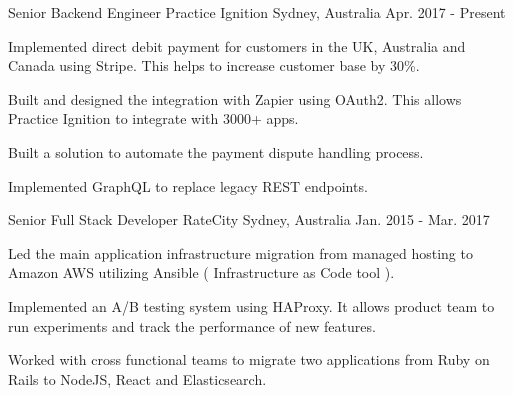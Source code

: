 
\begin{cventries}

  \cventry
    {Senior Backend Engineer} %
    {Practice Ignition} %
    {Sydney, Australia} %
    {Apr. 2017 - Present} %
    {
      \begin{cvitems} %
        \item {Implemented direct debit payment for customers in the UK, Australia and Canada using Stripe. This helps to increase customer base by 30\%.}
        \item {Built and designed the integration with Zapier using OAuth2. This allows Practice Ignition to integrate with 3000+ apps.}
        \item {Built a solution to automate the payment dispute handling process.}
        \item {Implemented GraphQL to replace legacy REST endpoints.}
      \end{cvitems}
    }

  \cventry
    {Senior Full Stack Developer} %
    {RateCity} %
    {Sydney, Australia} %
    {Jan. 2015 - Mar. 2017} %
    {
      \begin{cvitems} %
        \item {Led the main application infrastructure migration from managed hosting to Amazon AWS utilizing Ansible ( Infrastructure as Code tool ).}
        \item {Implemented an A/B testing system using HAProxy. It allows product team to run experiments and track the performance of new features.}
        \item {Worked with cross functional teams to migrate two applications from Ruby on Rails to NodeJS, React and Elasticsearch.}
      \end{cvitems}
    }


\end{cventries}
